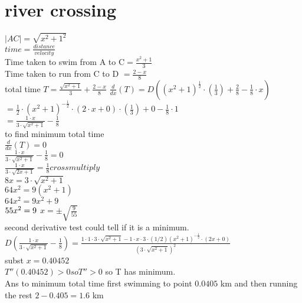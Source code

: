 \documentclass{article}
\begin{document}
  \section{river crossing}
  $|AC|=\sqrt{x^2+1^2}$\\
  $time=\frac{distance}{velocity}$\\
  Time taken to swim from A to C$=\frac{x^2+1}{3}$\\
  Time taken to run from C to D $=\frac{2-x}{8}$\\
  total time $T=\frac{\sqrt{x^2+1}}{3}+\frac{2-x}{8}$
  $\frac{d}{dx}(T)=D( (x^2+1)^{\frac{1}{2}}\cdot(\frac{1}{3})+\frac{2}{8}-\frac{1}{8}\cdot x )$\\
  $=\frac{1}{2}\cdot(x^2+1)^{-\frac{1}{2}}\cdot(2\cdot x+0)\cdot(\frac{1}{3})+0-\frac{1}{8}\cdot1$\\
  $=\frac{1\cdot x}{3\cdot\sqrt{x^2+1}}- \frac{1}{8}$\\
  to find minimum total time\\
  $\frac{d}{dx}(T)=0$\\
  $\frac{1\cdot x}{3\cdot\sqrt{x^2+1}}-\frac{1}{8}=0$\\
  $\frac{1\cdot x}{3\cdot\sqrt{2x+1}}=\frac{1}{8} cross multiply$\\
  $8x=3\cdot\sqrt{x^2+1}$\\
  $64x^2=9(x^2+1)$\\
  $64x^2=9x^2+9$\\
  $55x^2=9\\$
  $x=\pm\sqrt{\frac{9}{55}}$\\
  second derivative test could tell if it is a minimum.\\
  $D (\frac{1\cdot x}{3\cdot\sqrt{x^2+1}}-\frac{1}{8})=\frac{1\cdot1\cdot3\cdot\sqrt{x^2+1}-1\cdot x\cdot3\cdot(1/2)(x^2+1)^{-\frac{1}{2}}\cdot(2x+0)}{(3\cdot\sqrt{x^2+1})^2}$\\
  subst $x=0.40452$\\
  $T''(0.40452)>0 so T''>0$ so T has minimum.\\
  Ans to minimum total time first swimming to point $0.0405$ km and then running the rest $2-0.405=1.6$ km\\
  
  

   
\end{document}
